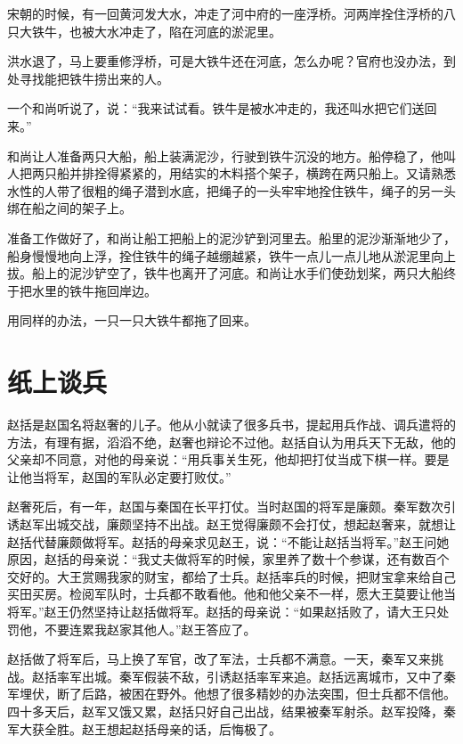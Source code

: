 \documentclass[12pt,UTF-8,openany]{ctexbook}
\begin{document}
\begin{large}
    
    宋朝的时候，有一回黄河发大水，冲走了河中府的一座浮桥。河两岸拴住浮桥的八只大铁牛，也被大水冲走了，陷在河底的淤泥里。
    
    洪水退了，马上要重修浮桥，可是大铁牛还在河底，怎么办呢？官府也没办法，到处寻找能把铁牛捞出来的人。
    
    一个和尚听说了，说：“我来试试看。铁牛是被水冲走的，我还叫水把它们送回来。”
    
    和尚让人准备两只大船，船上装满泥沙，行驶到铁牛沉没的地方。船停稳了，他叫人把两只船并排拴得紧紧的，用结实的木料搭个架子，横跨在两只船上。又请熟悉水性的人带了很粗的绳子潜到水底，把绳子的一头牢牢地拴住铁牛，绳子的另一头绑在船之间的架子上。
    
    准备工作做好了，和尚让船工把船上的泥沙铲到河里去。船里的泥沙渐渐地少了，船身慢慢地向上浮，拴住铁牛的绳子越绷越紧，铁牛一点儿一点儿地从淤泥里向上拔。船上的泥沙铲空了，铁牛也离开了河底。和尚让水手们使劲划桨，两只大船终于把水里的铁牛拖回岸边。
    
    用同样的办法，一只一只大铁牛都拖了回来。
    
\end{large}



\chapter{纸上谈兵}

\begin{large}
    
    赵括是赵国名将赵奢的儿子。他从小就读了很多兵书，提起用兵作战、调兵遣将的方法，有理有据，滔滔不绝，赵奢也辩论不过他。赵括自认为用兵天下无敌，他的父亲却不同意，对他的母亲说：“用兵事关生死，他却把打仗当成下棋一样。要是让他当将军，赵国的军队必定要打败仗。”
    
    赵奢死后，有一年，赵国与秦国在长平打仗。当时赵国的将军是廉颇。秦军数次引诱赵军出城交战，廉颇坚持不出战。赵王觉得廉颇不会打仗，想起赵奢来，就想让赵括代替廉颇做将军。赵括的母亲求见赵王，说：“不能让赵括当将军。”赵王问她原因，赵括的母亲说：“我丈夫做将军的时候，家里养了数十个参谋，还有数百个交好的。大王赏赐我家的财宝，都给了士兵。赵括率兵的时候，把财宝拿来给自己买田买房。检阅军队时，士兵都不敢看他。他和他父亲不一样，愿大王莫要让他当将军。”赵王仍然坚持让赵括做将军。赵括的母亲说：“如果赵括败了，请大王只处罚他，不要连累我赵家其他人。”赵王答应了。
    
    赵括做了将军后，马上换了军官，改了军法，士兵都不满意。一天，秦军又来挑战。赵括率军出城。秦军假装不敌，引诱赵括率军来追。赵括远离城市，又中了秦军埋伏，断了后路，被困在野外。他想了很多精妙的办法突围，但士兵都不信他。四十多天后，赵军又饿又累，赵括只好自己出战，结果被秦军射杀。赵军投降，秦军大获全胜。赵王想起赵括母亲的话，后悔极了。
    
\end{large}
\end{document}
